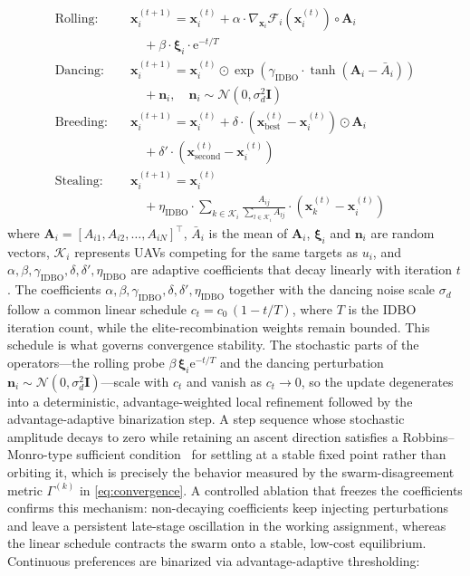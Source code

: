 \documentclass[lettersize,journal]{IEEEtran}
\newcommand{\hladd}[1]{{\color{blue}#1}}
\begin{document}
\begin{align}
\text{Rolling:} \quad & \mathbf{x}_i^{(t+1)} = \mathbf{x}_i^{(t)} + \alpha \cdot \nabla_{\mathbf{x}_i} \mathcal{F}_i(\mathbf{x}_i^{(t)}) \circ \mathbf{A}_i \nonumber \\
& \quad + \beta \cdot \boldsymbol{\xi}_i \cdot \mathrm{e}^{-t/T} \label{eq:rolling_update} \\
\text{Dancing:} \quad & \mathbf{x}_i^{(t+1)} = \mathbf{x}_i^{(t)} \odot \exp\left(\gamma_{\mathrm{IDBO}} \cdot \tanh(\mathbf{A}_i - \bar{A}_i)\right) \nonumber \\
& \quad + \mathbf{n}_i, \quad \mathbf{n}_i \sim \mathcal{N}(0, \sigma_d^2 \mathbf{I}) \label{eq:dancing_update} \\
\text{Breeding:} \quad & \mathbf{x}_i^{(t+1)} = \mathbf{x}_i^{(t)} + \delta \cdot \left(\mathbf{x}_{\text{best}}^{(t)} - \mathbf{x}_i^{(t)}\right) \odot \mathbf{A}_i \nonumber \\
& \quad + \delta' \cdot \left(\mathbf{x}_{\text{second}}^{(t)} - \mathbf{x}_i^{(t)}\right) \label{eq:breeding_update} \\
\text{Stealing:} \quad & \mathbf{x}_i^{(t+1)} = \mathbf{x}_i^{(t)} \nonumber \\
& \quad + \eta_{\mathrm{IDBO}} \cdot \sum_{k \in \mathcal{K}_i} \frac{A_{ij}}{\sum_{l \in \mathcal{K}_i} A_{lj}} \cdot \left(\mathbf{x}_k^{(t)} - \mathbf{x}_i^{(t)}\right) \label{eq:stealing_update}
\end{align}
where $\mathbf{A}_i = [A_{i1}, A_{i2}, \dots, A_{iN}]^\top$, $\bar{A}_i$ is the mean of $\mathbf{A}_i$, $\boldsymbol{\xi}_i$ and $\mathbf{n}_i$ are random vectors, $\mathcal{K}_i$ represents UAVs competing for the same targets as $u_i$, and $\alpha, \beta, \gamma_{\mathrm{IDBO}}, \delta, \delta', \eta_{\mathrm{IDBO}}$ are adaptive coefficients that decay linearly with iteration $t$. \hladd{The coefficients $\alpha,\beta,\gamma_{\mathrm{IDBO}},\delta,\delta',\eta_{\mathrm{IDBO}}$ together with the dancing noise scale $\sigma_d$ follow a common linear schedule $c_t=c_0\,(1-t/T)$, where $T$ is the IDBO iteration count, while the elite-recombination weights remain bounded. This schedule is what governs convergence stability. The stochastic parts of the operators---the rolling probe $\beta\,\boldsymbol{\xi}_i\mathrm{e}^{-t/T}$ and the dancing perturbation $\mathbf{n}_i\sim\mathcal{N}(0,\sigma_d^2\mathbf{I})$---scale with $c_t$ and vanish as $c_t\!\to\!0$, so the update degenerates into a deterministic, advantage-weighted local refinement followed by the advantage-adaptive binarization step. A step sequence whose stochastic amplitude decays to zero while retaining an ascent direction satisfies a Robbins--Monro-type sufficient condition~\cite{robbins1951stochastic} for settling at a stable fixed point rather than orbiting it, which is precisely the behavior measured by the swarm-disagreement metric $\Gamma^{(k)}$ in \eqref{eq:convergence}. A controlled ablation that freezes the coefficients confirms this mechanism: non-decaying coefficients keep injecting perturbations and leave a persistent late-stage oscillation in the working assignment, whereas the linear schedule contracts the swarm onto a stable, low-cost equilibrium.} Continuous preferences are binarized via advantage-adaptive thresholding:
\end{document}
